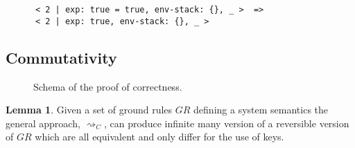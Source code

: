 \documentclass{article}[12pt,a4paper]
\theoremstyle{definition}
\newtheorem{lemma}{Lemma}
\begin{document}
\begin{Verbatim}
      < 2 | exp: true = true, env-stack: {}, _ >  =>
      < 2 | exp: true, env-stack: {}, _ >
\end{Verbatim}

\subsection{Commutativity}
\begin{figure}
  \centering
  \caption{ Schema of the proof of correctness. }
  \label{fig:square}
\end{figure}

\begin{lemma}\label{lemma:keys-equiv}
  Given a set of ground rules $GR$ defining a system semantics the general
  approach, $\rightsquigarrow_C$, can produce infinite many version of a
  reversible version of $GR$ which are all equivalent and only differ for the use of keys.
\end{lemma}
\end{document}
